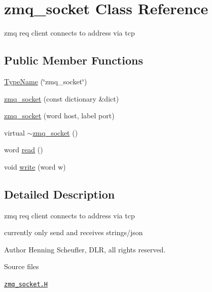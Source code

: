 \hypertarget{classFoam_1_1zmq__socket}{}\section{zmq\+\_\+socket Class Reference}
\label{classFoam_1_1zmq__socket}


zmq req client connects to address via tcp  


\subsection*{Public Member Functions}
\begin{DoxyCompactItemize}
\item 
\hyperlink{classFoam_1_1zmq__socket_ac7db4bd1db722832031f949eaffa2c10}{Type\+Name} (\char`\"{}zmq\+\_\+socket\char`\"{})
\item 
\hyperlink{classFoam_1_1zmq__socket_a6b35fb57a0f38b4cf2f5423cd3d91949}{zmq\+\_\+socket} (const dictionary \&dict)
\item 
\hyperlink{classFoam_1_1zmq__socket_a2a2c11c303e69b0230450fdeb77ae1ca}{zmq\+\_\+socket} (word host, label port)
\item 
virtual \hyperlink{classFoam_1_1zmq__socket_a1bb47135d794cda4b9ea1593254e33c0}{$\sim$zmq\+\_\+socket} ()
\item 
word \hyperlink{classFoam_1_1zmq__socket_aaef38f7ec08b1ae0135900e9ae1fb1f8}{read} ()
\item 
void \hyperlink{classFoam_1_1zmq__socket_a5abf104fabb38aa7c80721483091cf0b}{write} (word w)
\end{DoxyCompactItemize}


\subsection{Detailed Description}
zmq req client connects to address via tcp 

\label{_Description}%
 currently only send and receives strings/json

Author Henning Scheufler, D\+LR, all rights reserved.

\begin{DoxyParagraph}{Source files}

\begin{DoxyItemize}
\item \href{../../../home/carlo/data/GeN-Foam/GeN-Foam_ffn/GeN-Foam/GeN-Foam/FMU4FOAM/ECI4FOAM/src/externalComm/networkInterface/zmq_socket.H}{\tt zmq\+\_\+socket.\+H} 
\end{DoxyItemize}
\end{DoxyParagraph}


